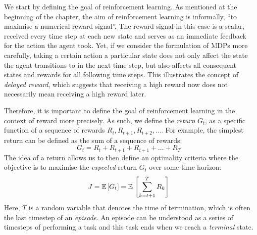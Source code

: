 We start by defining the goal of reinforcement learning. As mentioned at the beginning of the chapter, the aim of reinforcement learning is informally, ``to maximise a numerical reward signal''. The reward signal in this case is a scalar, received every time step at each new state and serves as an immediate feedback for the action the agent took. Yet, if we consider the formulation of MDPs more carefully, taking a certain action a particular state does not only affect the state the agent transitions to in the next time step, but also affects all consequent states and rewards for all following time steps. This illustrates the concept of \textit{delayed reward}, which suggests that receiving a high reward now does not necessarily mean receiving a high reward later.

Therefore, it is important to define the goal of reinforcement learning in the context of reward more precisely. As such, we define the \textit{return} $G_t$, as a specific function of a sequence of rewards $R_t, R_{t+1}, R_{t+2}, ...$. For example, the simplest return can be defined as the sum of a sequence of rewards:
\begin{equation}
    G_t = R_t + R_{t+1} + R_{t+1} + ... + R_{T}
\end{equation}
The idea of a return allows us to then define an optimality criteria where the objective is to maximise the \textit{expected} return $G_t$ over some time horizon:
\begin{equation}
    J = \mathbb{E} \hspace{0.5mm} [G_t] = \mathbb{E}\hspace{0.5mm}\left[ \sum^{T}_{k=t+1} R_{k} \right]
\end{equation}
Here, $T$ is a random variable that denotes the time of termination, which is often the last timestep of an \textit{episode}. An episode can be understood as a series of timesteps of performing a task and this task ends when we reach a \textit{terminal} state.

